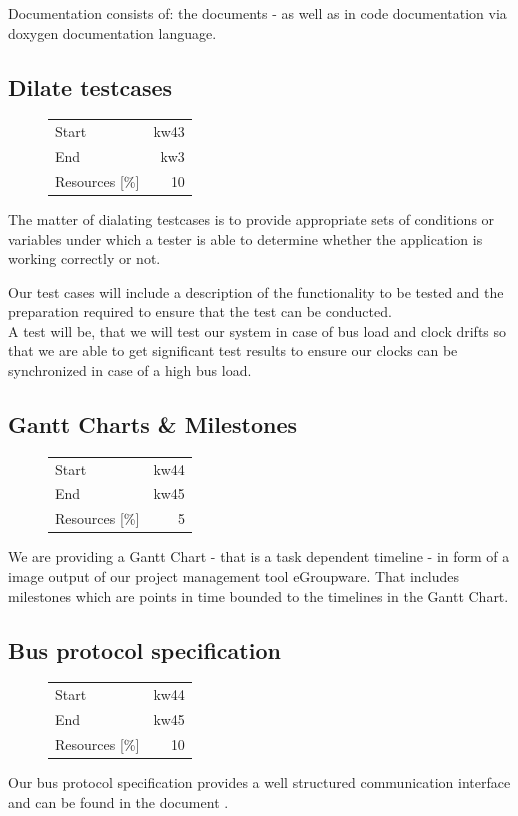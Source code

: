 Documentation consists of: the documents \cite [NESD1]{NESD1} - \cite [NESD5]{NESD5} 
as well as in code documentation via doxygen documentation language.

\subsection{Dilate testcases}
\begin{figure}
\begin{tabular}[t]{|lr|}
\hline
Start & kw43\\
End & kw3\\
Resources [\%] & 10\\
\hline
\end{tabular}
\end{figure}
The matter of dialating testcases is to provide appropriate sets of conditions or variables under which
a tester is able to determine whether the application is working correctly or not.

Our test cases will include a description of the functionality to be tested and the preparation required
to ensure that the test can be conducted.\\
A test will be, that we will test our system in case of bus load and clock drifts so that we are able to get
significant test results to ensure our clocks can be synchronized in case of a high bus load.

\subsection{Gantt Charts \& Milestones}
\begin{figure}
\begin{tabular}[t]{|lr|}
\hline
Start & kw44\\
End & kw45\\
Resources [\%] & 5\\
\hline
\end{tabular}
\end{figure}
We are providing a Gantt Chart - that is a task dependent timeline - in form of a image output of our 
project management tool eGroupware. That includes milestones which are points 
in time bounded to the timelines in the Gantt Chart.
\subsection{Bus protocol specification}
\begin{figure}
\begin{tabular}[t]{|lr|}
\hline
Start & kw44\\
End & kw45\\
Resources [\%] & 10\\
\hline
\end{tabular}
\end{figure}
Our bus protocol specification provides a well structured communication interface and can be found in the document \cite [NESD2]{NESD2}.

